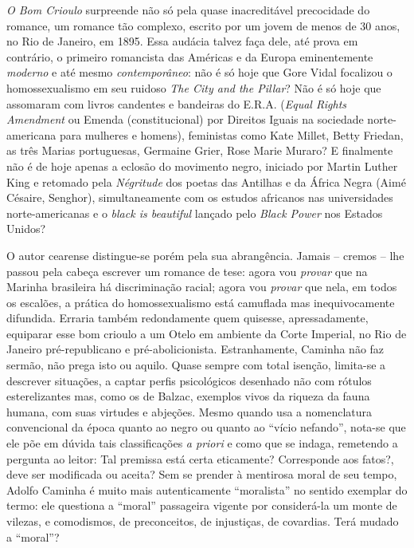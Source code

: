 \documentclass[
  letterpaper,
  DIV=11,
  numbers=noendperiod]{scrreprt}
\begin{document}
\emph{O Bom Crioulo} surpreende não só pela quase inacreditável
precocidade do romance, um romance tão complexo, escrito por um jovem de
menos de 30 anos, no Rio de Janeiro, em 1895. Essa audácia talvez faça
dele, até prova em contrário, o primeiro romancista das Américas e da
Europa eminentemente \emph{moderno} e até mesmo \emph{contemporâneo}:
não é só hoje que Gore Vidal focalizou o homossexualismo em seu ruidoso
\emph{The City and the Pillar}? Não é só hoje que assomaram com livros
candentes e bandeiras do E.R.A. (\emph{Equal Rights Amendment} ou Emenda
(constitucional) por Direitos Iguais na sociedade norte-americana para
mulheres e homens), feministas como Kate Millet, Betty Friedan, as três
Marias portuguesas, Germaine Grier, Rose Marie Muraro? E finalmente não
é de hoje apenas a eclosão do movimento negro, iniciado por Martin
Luther King e retomado pela \emph{Négritude} dos poetas das Antilhas e
da África Negra (Aimé Césaire, Senghor), simultaneamente com os estudos
africanos nas universidades norte-americanas e o \emph{black is
beautiful} lançado pelo \emph{Black Power} nos Estados Unidos?

O autor cearense distingue-se porém pela sua abrangência. Jamais --
cremos -- lhe passou pela cabeça escrever um romance de tese: agora vou
\emph{provar} que na Marinha brasileira há discriminação racial; agora
vou \emph{provar} que nela, em todos os escalões, a prática do
homossexualismo está camuflada mas inequivocamente difundida. Erraria
também redondamente quem quisesse, apressadamente, equiparar esse bom
crioulo a um Otelo em ambiente da Corte Imperial, no Rio de Janeiro
pré-republicano e pré-abolicionista. Estranhamente, Caminha não faz
sermão, não prega isto ou aquilo. Quase sempre com total isenção,
limita-se a descrever situações, a captar perfis psicológicos desenhado
não com rótulos esterelizantes mas, como os de Balzac, exemplos vivos da
riqueza da fauna humana, com suas virtudes e abjeções. Mesmo quando usa
a nomenclatura convencional da época quanto ao negro ou quanto ao
``vício nefando'', nota-se que ele põe em dúvida tais classificações
\emph{a priori} e como que se indaga, remetendo a pergunta ao leitor:
Tal premissa está certa eticamente? Corresponde aos fatos?, deve ser
modificada ou aceita? Sem se prender à mentirosa moral de seu tempo,
Adolfo Caminha é muito mais autenticamente ``moralista'' no sentido
exemplar do termo: ele questiona a ``moral'' passageira vigente por
considerá-la um monte de vilezas, e comodismos, de preconceitos, de
injustiças, de covardias. Terá mudado a ``moral''?
\end{document}
